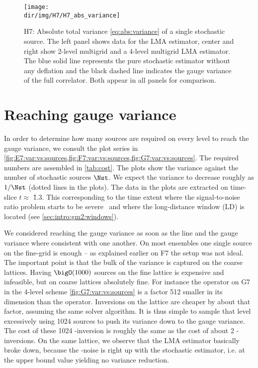 \begin{figure}
\centering
\texttt{[image: \\dir/img/H7/H7\_abs\_variance]}
\caption{
H7: Absolute total variance \cref{eq:abs:variance} of a single stochastic source.
The left panel shows data for the LMA estimator, center and right show 2-level multigrid and a 4-level multigrid LMA estimator.
The blue solid line represents the pure stochastic estimator without any deflation and the black dashed line indicates the gauge variance of the full correlator. Both appear in all panels for comparison.
}
\label{fig:H7:abs:variance}
\end{figure}

\section{Reaching gauge variance}

In order to determine how many sources are required on every level to reach the gauge variance, we consult the plot series in \cref{fig:E7:var:vs:sources,fig:F7:var:vs:sources,fig:G7:var:vs:sources}.
The required numbers are assembled in \cref{tab:cost}.
The plots show the variance against the number of stochastic sources $\Nst$.
We expect the variance to decrease roughly as $1/\Nst$ (dotted lines in the plots).
The data in the plots are extracted on time-slice $t \approx $ \u{1.3}{\femto \metre}.
This corresponding to the time extent where the signal-to-noise ratio problem starts to be severe~\cite{Kuberski_2023} and where the long-distance window (LD) is located (see \cref{sec:intro:gm2:windows}).

We considered reaching the gauge variance as soon as the line and the gauge variance where consistent with one another.
On most ensembles one single source on the fine-grid is enough -- as explained earlier on F7 the setup was not ideal.
The important point is that the bulk of the variance is captured on the coarse lattices.
Having $\bigO(1000)$ sources on the fine lattice is expensive and infeasible, but on coarse lattices absolutely fine.
For instance the  operator on G7 in the 4-level scheme \cref{fig:G7:var:vs:sources} is a factor \num{512} smaller in its dimension than the  operator.
Inversions on the  lattice are cheaper by about that factor, assuming the same solver algorithm.
It is thus simple to sample that level excessively using \num{1024} sources to push its variance down to the gauge variance.
The cost of these \num{1024} -inversion is roughly the same as the cost of about \num{2} -inversions.
On the same lattice, we observe that the LMA estimator basically broke down, because the -noise is right up with the stochastic estimator, i.e. at the upper bound value yielding no variance reduction.

